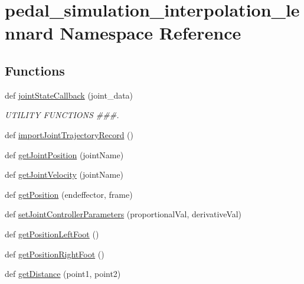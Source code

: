 \hypertarget{namespacepedal__simulation__interpolation__lennard}{}\section{pedal\+\_\+simulation\+\_\+interpolation\+\_\+lennard Namespace Reference}
\label{namespacepedal__simulation__interpolation__lennard}
\subsection*{Functions}
\begin{DoxyCompactItemize}
\item 
def \mbox{\hyperlink{namespacepedal__simulation__interpolation__lennard_ab9a39836c39b6c57ca0b2df40c55f1f2}{joint\+State\+Callback}} (joint\+\_\+data)
\begin{DoxyCompactList}\small\item\em U\+T\+I\+L\+I\+TY F\+U\+N\+C\+T\+I\+O\+NS \#\#\#. \end{DoxyCompactList}\item 
def \mbox{\hyperlink{namespacepedal__simulation__interpolation__lennard_a5a036e0bd506a49d783029505009f6df}{import\+Joint\+Trajectory\+Record}} ()
\item 
def \mbox{\hyperlink{namespacepedal__simulation__interpolation__lennard_a263b74f3ddb54b9e95d06959a0440d9d}{get\+Joint\+Position}} (joint\+Name)
\item 
def \mbox{\hyperlink{namespacepedal__simulation__interpolation__lennard_ab3b445524e89f7d7bc9a8ec45b1f07f4}{get\+Joint\+Velocity}} (joint\+Name)
\item 
def \mbox{\hyperlink{namespacepedal__simulation__interpolation__lennard_a969588f3fe304c84fa019fa4b127a570}{get\+Position}} (endeffector, frame)
\item 
def \mbox{\hyperlink{namespacepedal__simulation__interpolation__lennard_a5242a7e839734b703f3e0ef1e110aa48}{set\+Joint\+Controller\+Parameters}} (proportional\+Val, derivative\+Val)
\item 
def \mbox{\hyperlink{namespacepedal__simulation__interpolation__lennard_a6fdd92c1f03fc774934bec80e4a979ad}{get\+Position\+Left\+Foot}} ()
\item 
def \mbox{\hyperlink{namespacepedal__simulation__interpolation__lennard_abb08f2f8688e42558413e293c10e85aa}{get\+Position\+Right\+Foot}} ()
\item 
def \mbox{\hyperlink{namespacepedal__simulation__interpolation__lennard_ae05070664cd3aa63d2e042189b7b2e02}{get\+Distance}} (point1, point2)

\end{DoxyCompactItemize}
